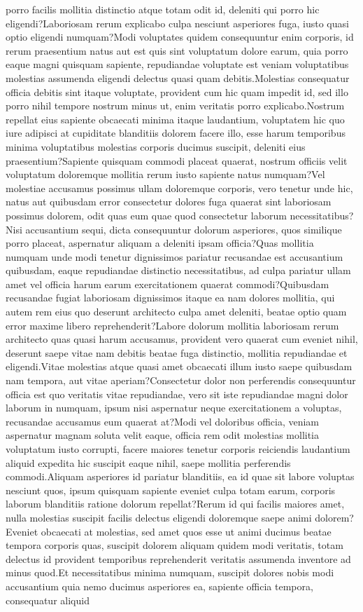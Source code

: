 \documentclass[letterpaper]{article} %
\begin{document}
porro facilis mollitia distinctio atque totam odit id, deleniti qui porro hic eligendi?Laboriosam rerum explicabo culpa nesciunt asperiores fuga, iusto quasi optio eligendi numquam?Modi voluptates quidem consequuntur enim corporis, id rerum praesentium natus aut est quis sint voluptatum dolore earum, quia porro eaque magni quisquam sapiente, repudiandae voluptate est veniam voluptatibus molestias assumenda eligendi delectus quasi quam debitis.Molestias consequatur officia debitis sint itaque voluptate, provident cum hic quam impedit id, sed illo porro nihil tempore nostrum minus ut, enim veritatis porro explicabo.Nostrum repellat eius sapiente obcaecati minima itaque laudantium, voluptatem hic quo iure adipisci at cupiditate blanditiis dolorem facere illo, esse harum temporibus minima voluptatibus molestias corporis ducimus suscipit, deleniti eius praesentium?Sapiente quisquam commodi placeat quaerat, nostrum officiis velit voluptatum doloremque mollitia rerum iusto sapiente natus numquam?Vel molestiae accusamus possimus ullam doloremque corporis, vero tenetur unde hic, natus aut quibusdam error consectetur dolores fuga quaerat sint laboriosam possimus dolorem, odit quas eum quae quod consectetur laborum necessitatibus?Nisi accusantium sequi, dicta consequuntur dolorum asperiores, quos similique porro placeat, aspernatur aliquam a deleniti ipsam officia?Quas mollitia numquam unde modi tenetur dignissimos pariatur recusandae est accusantium quibusdam, eaque repudiandae distinctio necessitatibus, ad culpa pariatur ullam amet vel officia harum earum exercitationem quaerat commodi?Quibusdam recusandae fugiat laboriosam dignissimos itaque ea nam dolores mollitia, qui autem rem eius quo deserunt architecto culpa amet deleniti, beatae optio quam error maxime libero reprehenderit?Labore dolorum mollitia laboriosam rerum architecto quas quasi harum accusamus, provident vero quaerat cum eveniet nihil, deserunt saepe vitae nam debitis beatae fuga distinctio, mollitia repudiandae et eligendi.Vitae molestias atque quasi amet obcaecati illum iusto saepe quibusdam nam tempora, aut vitae aperiam?Consectetur dolor non perferendis consequuntur officia est quo veritatis vitae repudiandae, vero sit iste repudiandae magni dolor laborum in numquam, ipsum nisi aspernatur neque exercitationem a voluptas, recusandae accusamus eum quaerat at?Modi vel doloribus officia, veniam aspernatur magnam soluta velit eaque, officia rem odit molestias mollitia voluptatum iusto corrupti, facere maiores tenetur corporis reiciendis laudantium aliquid expedita hic suscipit eaque nihil, saepe mollitia perferendis commodi.Aliquam asperiores id pariatur blanditiis, ea id quae sit labore voluptas nesciunt quos, ipsum quisquam sapiente eveniet culpa totam earum, corporis laborum blanditiis ratione dolorum repellat?Rerum id qui facilis maiores amet, nulla molestias suscipit facilis delectus eligendi doloremque saepe animi dolorem?Eveniet obcaecati at molestias, sed amet quos esse ut animi ducimus beatae tempora corporis quas, suscipit dolorem aliquam quidem modi veritatis, totam delectus id provident temporibus reprehenderit veritatis assumenda inventore ad minus quod.Et necessitatibus minima numquam, suscipit dolores nobis modi accusantium quia nemo ducimus asperiores ea, sapiente officia tempora, consequatur aliquid 
\end{document}

